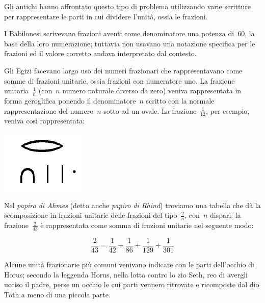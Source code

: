 Gli antichi hanno affrontato questo tipo di problema utilizzando varie
scritture per rappresentare le parti in cui dividere l'unità, ossia le
frazioni.

I Babilonesi scrivevano frazioni aventi come denominatore una potenza di~60,
la base della loro numerazione; tuttavia non usavano una notazione specifica
per le frazioni ed il valore corretto andava interpretato dal contesto.

Gli Egizi facevano largo uso dei numeri frazionari che rappresentavano come
somme di frazioni unitarie, ossia frazioni con numeratore uno.
La frazione unitaria~\(\frac{1}{n}\) (con~\(n\) numero naturale diverso da zero)
veniva rappresentata in forma geroglifica ponendo il denominatore~\(n\) scritto
con la normale rappresentazione del numero~\(n\) sotto ad un ovale.
La frazione~\(\frac{1}{12}\), per esempio, veniva così rappresentata:


\vspace{-2ex}
\begin{center}
\begin{inaccessibleblock}
 \includegraphics[scale=0.28]{img/giero.png}
\end{inaccessibleblock}
\end{center}
\vspace{-2ex}

Nel \emph{papiro di Ahmes} (detto anche \emph{papiro di Rhind}) troviamo una
tabella che dà la scomposizione in frazioni unitarie delle frazioni del
tipo~\(\frac{2}{n}\), con~\(n\) dispari: la frazione~\(\frac{2}{43}\)
è rappresentata come somma di frazioni unitarie nel seguente modo:

\begin{minipage}{.49\textwidth}
\[\frac{2}{43}=\frac{1}{42}+\frac{1}{86}+\frac{1}{129}+\frac{1}{301}\]

 Alcune unità frazionarie più comuni venivano indicate con le parti
dell'occhio
di Horus; secondo la leggenda Horus, nella lotta contro lo zio Seth,
reo di avergli ucciso il padre, perse un occhio le cui parti vennero
ritrovate
e ricomposte dal dio Toth a meno di una piccola parte.
\end{minipage}
\begin{minipage}{.49\textwidth}
\begin{inaccessibleblock}
\begin{center}  \end{center}
\end{inaccessibleblock}
\end{minipage}

